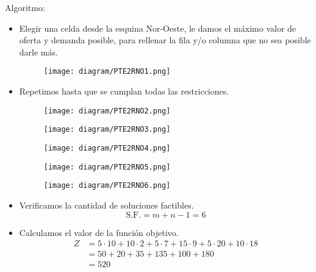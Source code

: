 \documentclass{templateNote}
\begin{document}
Algoritmo:
\begin{itemize}
    \item Elegir una celda desde la esquina Nor-Oeste, le damos el máximo valor de oferta y demanda posible, para rellenar la fila y/o columna que no sea posible darle más.
    \begin{figure}[H]
        \centering
        \texttt{[image: diagram/PTE2RNO1.png]}
    \end{figure}

    \item Repetimos hasta que se cumplan todas las restricciones.
    \begin{figure}[H]
        \centering
        \texttt{[image: diagram/PTE2RNO2.png]}
    \end{figure}

    \begin{figure}[H]
        \centering
        \texttt{[image: diagram/PTE2RNO3.png]}
    \end{figure}

    \begin{figure}[H]
        \centering
        \texttt{[image: diagram/PTE2RNO4.png]}
    \end{figure}

    \begin{figure}[H]
        \centering
        \texttt{[image: diagram/PTE2RNO5.png]}
    \end{figure}

    \begin{figure}[H]
        \centering
        \texttt{[image: diagram/PTE2RNO6.png]}
    \end{figure}

    \item Verificamos la cantidad de soluciones factibles.
    \begin{equation*}
        \text{S.F.} = m+n-1 = 6
    \end{equation*}

    \item Calculamos el valor de la función objetivo.
    \begin{align*}
        Z &= 5 \cdot 10 + 10 \cdot 2 + 5 \cdot 7 + 15 \cdot 9 + 5 \cdot 20 + 10 \cdot 18 \\
        &= 50 + 20 + 35 + 135 + 100 + 180 \\
        &= 520 
    \end{align*}
\end{itemize}
\end{document}
